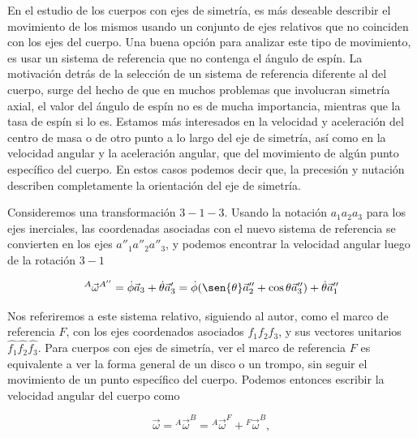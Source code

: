 \documentclass[a4paper,10pt]{article}
\numberwithin{equation}{section}
\begin{document}
\vspace{.3cm}

En el estudio de los cuerpos con ejes de simetría, es más deseable describir el 
movimiento de los mismos usando un conjunto de ejes relativos que no coinciden con 
los ejes del cuerpo. Una buena opción para analizar este tipo de movimiento, 
es usar un sistema de referencia que no contenga el ángulo de espín. La motivación 
detrás de la selección de un sistema de referencia diferente al del cuerpo, 
surge del hecho de que en muchos problemas que involucran simetría axial, 
el valor del ángulo de espín no es de mucha importancia, mientras que la tasa de 
espín si lo es. Estamos más interesados en la velocidad y aceleración del centro 
de masa o de otro punto a lo largo del eje de simetría, así como en la velocidad
angular y la aceleración angular, que del movimiento de algún punto específico del 
cuerpo. En estos casos podemos decir que, la precesión y nutación describen completamente 
la orientación del eje de simetría.

\vspace{.3cm}

Consideremos una transformación $3-1-3$. Usando la notación $a_1a_2a_3$ para los 
ejes inerciales, las coordenadas asociadas con el nuevo sistema de referencia se 
convierten en los ejes $a''_1a''_2a''_3$, y podemos encontrar la velocidad angular 
luego de la rotación $3-1$ 

\begin{equation}
 {^A}{ \vec{\omega}}^{A''} = \dot{\phi}\vec{a}_3 + \dot{\theta}\vec{a}'_3 = 
 \dot{\phi}(\sen{\theta}\vec{a}''_2 + \cos{\theta}\vec{a}''_3) + \dot{\theta}\vec{a}''_1
\label{eq:velAngFframe1}
\end{equation}

Nos referiremos a este sistema relativo, siguiendo al autor, como el marco de referencia 
$F$, con los ejes coordenados asociados $f_1f_2f_3$, y sus vectores unitarios 
$\hat{f_1}\hat{f_2}\hat{f_3}$. Para cuerpos con ejes de simetría, ver el marco de 
referencia $F$ es equivalente a ver la forma general de un disco o un trompo, sin 
seguir el movimiento de un punto específico del cuerpo. Podemos entonces escribir 
la velocidad angular del cuerpo como 

\begin{equation}
 \vec{\omega} =  {^A}{ \vec{\omega}}^{B} =  {^A}{ \vec{\omega}}^{F} + 
  {^F}{ \vec{\omega}}^{B},
  \label{eq:velAngFframe2}
\end{equation}
\end{document}
